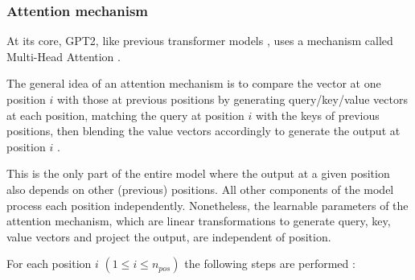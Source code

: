 \subsubsection{Attention mechanism}
\label{gpt2_attn}




At its core, GPT2, like previous transformer models , uses a mechanism called Multi-Head Attention .

The general idea of an attention mechanism is to compare the vector at one position $i$ with those at previous positions by generating query/key/value vectors at each position, matching the query at position $i$ with the keys of previous positions, then blending the value vectors accordingly to generate the output at position $i$ \cite{alammar-transformer} \cite{alammar-gpt2}.

This is the only part of the entire model where the output at a given position also depends on other (previous) positions. All other components of the model process each position independently.
Nonetheless, the learnable parameters of the attention mechanism, which are linear transformations to generate query, key, value vectors and project the output, are independent of position.


For each position $i$ $(1 \leq i \leq n_{pos})$ the following steps are performed  \cite{alammar-transformer} \cite{alammar-gpt2}:


